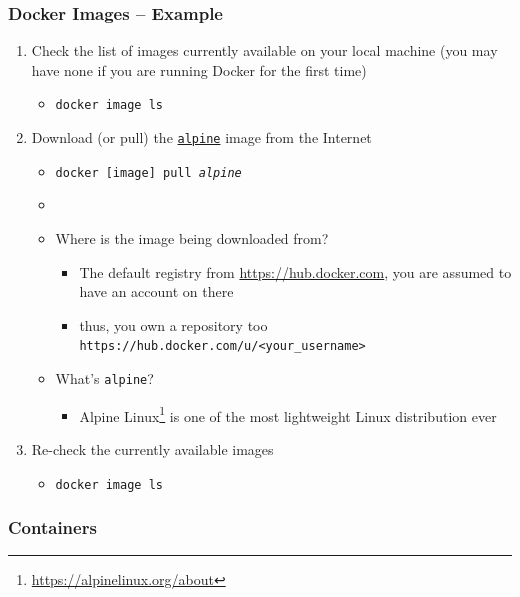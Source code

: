 \documentclass[handout]{beamer}\mode<presentation>{\usetheme{AMSCesenaBleu}}
\begin{document}
\begin{frame}
\frametitle{Docker Images -- Example}
	\begin{enumerate}
		\item<1> Check the list of images currently available on your local machine (you may have none if you are running Docker for the first time)
		\begin{itemize}
		    \item<1>[\$] \texttt{docker image \alert{ls}}
		\end{itemize}
		
		\item<2-4> Download (or \alert{pull}) the \href{https://hub.docker.com/_/alpine/}{\texttt{alpine}} image from the Internet
		\begin{itemize}
		    \item<2-4>[\$] \texttt{docker [image] \alert{pull} \textit{alpine}} 
		    \item<2-4>[] 
		    \item<3-4> Where is the image being downloaded from?
		    \begin{itemize}
		        \item<3-4> The default registry from \url{https://hub.docker.com}, you are assumed to have an account on there 
		        \item<3-4> thus, you own a repository too \texttt{https://hub.docker.com/u/\alert{<your\_username>}}
		    \end{itemize}
		    \item<4> What's \texttt{alpine}?
		    \begin{itemize}
		        \item<4> Alpine Linux\footnote{\url{https://alpinelinux.org/about}} is one of the most lightweight Linux distribution ever 
		    \end{itemize}
		\end{itemize}
		
		\item<5> Re-check the currently available images
		\begin{itemize}
		    \item<5>[\$] \texttt{docker image \alert{ls}} 
	    \end{itemize}
	\end{enumerate}
\end{frame}

\subsubsection{Containers}
\end{document}
